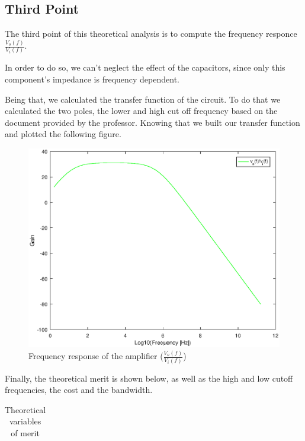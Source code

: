 \subsection{Third Point}

\par The third point of this theoretical analysis is to compute the frequency responce $\frac{V_o(f)}{V_i(f)}$. 
\par In order to do so, we can't neglect the effect of the capacitors, since only this component's impedance is frequency dependent.
\par Being that, we calculated the transfer function of the circuit. To do that we calculated the two poles, the lower and high cut off frequency based on the document provided by the professor. Knowing that we built our transfer function and plotted the following figure.

\begin{figure}[H] 
	\centering
	\includegraphics[width=1\linewidth]{teoria.eps}
	\caption{Frequency response of the amplifier ($\frac{V_o(f)}{V_i(f)}$)}
\end{figure}

\par Finally, the theoretical merit is shown below, as well as the high and low cutoff frequencies, the cost and the bandwidth.

\vspace{5mm}
\begin{table}[H]
	\centering
	\begin{tabularx}{0.9\textwidth} {
 	    | >{\raggedright\arraybackslash}X
  	    | >{\raggedleft\arraybackslash}X | }
	\hline
	
	\end{tabularx}
	\caption{Theoretical variables of merit}
	\label{tab:merit1}
\end{table}
\vspace{5mm}

